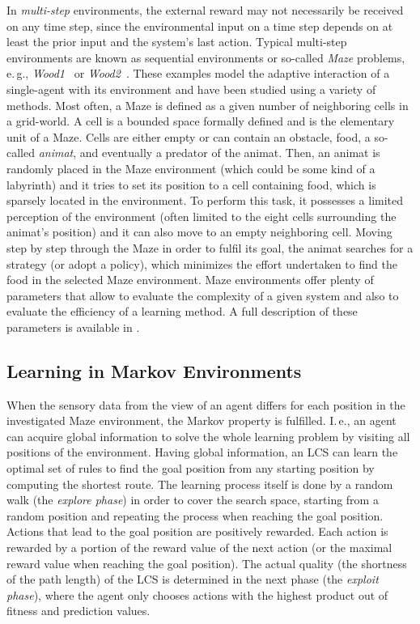 In \emph{multi-step} environments, the external reward may not necessarily be received on any time step, since the environmental input on a time step depends on at least the prior input and the system's last action. Typical multi-step environments are known as sequential environments or so-called \emph{Maze} problems, e.\,g., \emph{Wood1}~\cite{Wil94} or \emph{Wood2}~\cite{Wil95}. These examples model the adaptive interaction of a single-agent with its environment and have been studied using a variety of methods. Most often, a Maze is defined as a given number of neighboring cells in a grid-world. A cell is a bounded space formally defined and is the elementary unit of a Maze. Cells are either empty or can contain an obstacle, food, a so-called \emph{animat}, and eventually a predator of the animat. Then, an animat is randomly placed in the Maze environment (which could be some kind of a labyrinth) and it tries to set its position to a cell containing food, which is sparsely located in the environment. To perform this task, it possesses a limited perception of the environment (often limited to the eight cells surrounding the animat's position) and it can also move to an empty neighboring cell. Moving step by step through the Maze in order to fulfil its goal, the animat searches for a strategy (or adopt a policy), which minimizes the effort undertaken to find the food in the selected Maze environment. Maze environments offer plenty of parameters that allow to evaluate the complexity of a given system and also to evaluate the efficiency of a learning method. A full description of these parameters is available in \cite{BZ05}.

\subsection{Learning in Markov Environments} %
\label{subsection:learning-markov}

When the sensory data from the view of an agent differs for each position in the investigated Maze environment, the Markov property is fulfilled. I.\,e., an agent can acquire global information to solve the whole learning problem by visiting all positions of the environment. Having global information, an LCS can learn the optimal set of rules to find the goal position from any starting position by computing the shortest route. The learning process itself is done by a random walk (the \emph{explore phase}) in order to cover the search space, starting from a random position and repeating the process when reaching the goal position. Actions that lead to the goal position are positively rewarded. Each action is rewarded by a portion of the reward value of the next action (or the maximal reward value when reaching the goal position). The actual quality (the shortness of the path length) of the LCS is determined in the next phase (the \emph{exploit phase}), where the agent only chooses actions with the highest product out of fitness and prediction values.

